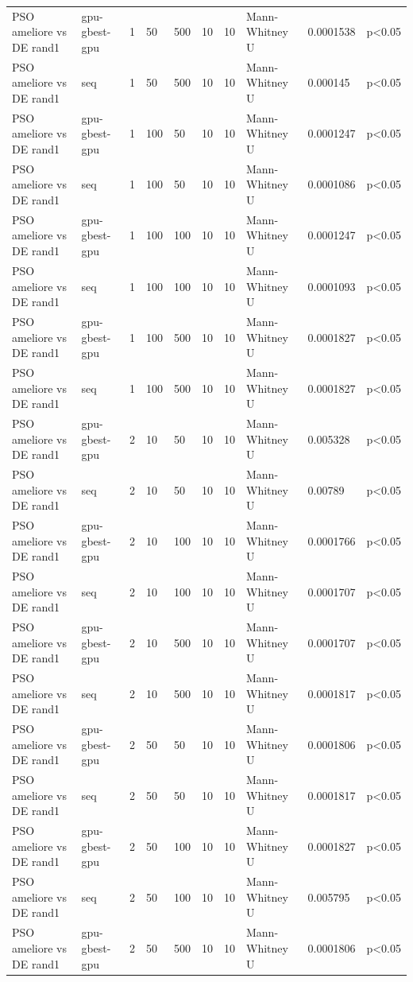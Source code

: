 \begin{table}[t]
\begin{tabular}{llllllllll}
PSO ameliore vs DE rand1 & gpu-gbest-gpu & 1 & 50 & 500 & 10 & 10 & Mann-Whitney U & 0.0001538 & p<0.05 \\
PSO ameliore vs DE rand1 & seq & 1 & 50 & 500 & 10 & 10 & Mann-Whitney U & 0.000145 & p<0.05 \\
PSO ameliore vs DE rand1 & gpu-gbest-gpu & 1 & 100 & 50 & 10 & 10 & Mann-Whitney U & 0.0001247 & p<0.05 \\
PSO ameliore vs DE rand1 & seq & 1 & 100 & 50 & 10 & 10 & Mann-Whitney U & 0.0001086 & p<0.05 \\
PSO ameliore vs DE rand1 & gpu-gbest-gpu & 1 & 100 & 100 & 10 & 10 & Mann-Whitney U & 0.0001247 & p<0.05 \\
PSO ameliore vs DE rand1 & seq & 1 & 100 & 100 & 10 & 10 & Mann-Whitney U & 0.0001093 & p<0.05 \\
PSO ameliore vs DE rand1 & gpu-gbest-gpu & 1 & 100 & 500 & 10 & 10 & Mann-Whitney U & 0.0001827 & p<0.05 \\
PSO ameliore vs DE rand1 & seq & 1 & 100 & 500 & 10 & 10 & Mann-Whitney U & 0.0001827 & p<0.05 \\
PSO ameliore vs DE rand1 & gpu-gbest-gpu & 2 & 10 & 50 & 10 & 10 & Mann-Whitney U & 0.005328 & p<0.05 \\
PSO ameliore vs DE rand1 & seq & 2 & 10 & 50 & 10 & 10 & Mann-Whitney U & 0.00789 & p<0.05 \\
PSO ameliore vs DE rand1 & gpu-gbest-gpu & 2 & 10 & 100 & 10 & 10 & Mann-Whitney U & 0.0001766 & p<0.05 \\
PSO ameliore vs DE rand1 & seq & 2 & 10 & 100 & 10 & 10 & Mann-Whitney U & 0.0001707 & p<0.05 \\
PSO ameliore vs DE rand1 & gpu-gbest-gpu & 2 & 10 & 500 & 10 & 10 & Mann-Whitney U & 0.0001707 & p<0.05 \\
PSO ameliore vs DE rand1 & seq & 2 & 10 & 500 & 10 & 10 & Mann-Whitney U & 0.0001817 & p<0.05 \\
PSO ameliore vs DE rand1 & gpu-gbest-gpu & 2 & 50 & 50 & 10 & 10 & Mann-Whitney U & 0.0001806 & p<0.05 \\
PSO ameliore vs DE rand1 & seq & 2 & 50 & 50 & 10 & 10 & Mann-Whitney U & 0.0001817 & p<0.05 \\
PSO ameliore vs DE rand1 & gpu-gbest-gpu & 2 & 50 & 100 & 10 & 10 & Mann-Whitney U & 0.0001827 & p<0.05 \\
PSO ameliore vs DE rand1 & seq & 2 & 50 & 100 & 10 & 10 & Mann-Whitney U & 0.005795 & p<0.05 \\
PSO ameliore vs DE rand1 & gpu-gbest-gpu & 2 & 50 & 500 & 10 & 10 & Mann-Whitney U & 0.0001806 & p<0.05 \\

\end{tabular}
\end{table}
